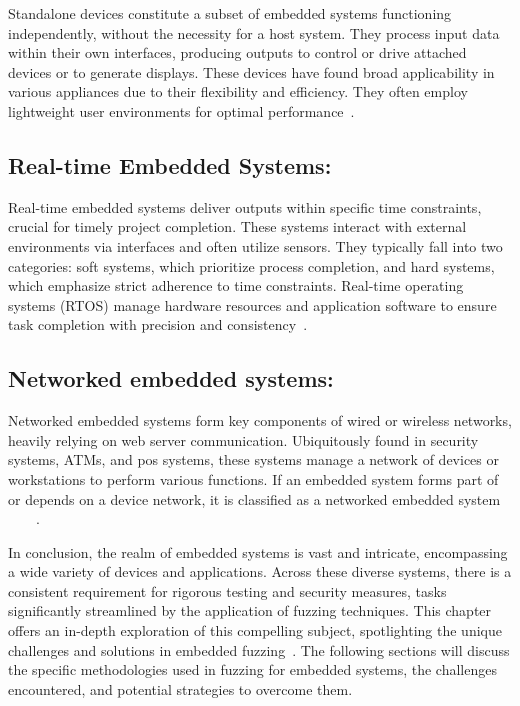 Standalone devices constitute a subset of embedded systems functioning
independently, without the necessity for a host system. They process input data
within their own interfaces, producing outputs to control or drive attached
devices or to generate displays. These devices have found broad applicability in
various appliances due to their flexibility and efficiency. They often employ
lightweight user environments for
optimal performance~\cite{yun2022fuzzing}\cite{WhatAreE30:online}\cite{TypesofE31:online}.

\subsection*{Real-time Embedded Systems:}
Real-time embedded systems deliver outputs within specific time constraints,
crucial for timely project completion. These systems interact with external
environments via interfaces and often utilize sensors. They typically fall into
two categories: soft systems, which prioritize process completion, and hard
systems, which emphasize strict adherence to time constraints. Real-time
operating systems (RTOS) manage hardware resources and application software to
ensure task completion with precision and
consistency~\cite{Introduc22:online}\cite{yun2022fuzzing}\cite{WhatAreE30:online}\cite{TypesofE31:online}.

\subsection*{Networked embedded systems:}
Networked embedded systems form key components of wired or wireless networks,
heavily relying on web server communication. Ubiquitously found in security systems,
ATMs, and \acrlong{pos}\cite{WhatIsaP12:online} systems, these systems manage a network of devices or workstations
to perform various functions. If an embedded system forms part of or depends on a device network,
it is classified as a networked embedded
system ~\cite{Introduc22:online}~\cite{yun2022fuzzing}~\cite{WhatAreE30:online}~\cite{TypesofE31:online}.

In conclusion, the realm of embedded systems is vast and intricate,
encompassing a wide variety of devices and applications. Across these diverse
systems, there is a consistent requirement for rigorous testing and security
measures, tasks significantly streamlined by the application of fuzzing
techniques. This chapter offers an in-depth exploration of this compelling
subject, spotlighting the unique challenges and solutions in embedded
fuzzing~\cite{eisele2022embedded}. The following sections will discuss the
specific methodologies used in fuzzing for embedded systems, the challenges
encountered, and potential strategies to overcome them.


